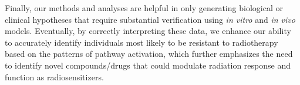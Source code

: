 \documentclass[hidelinks,11pt]{article}
\begin{document}
Finally, our methods and analyses are helpful in only generating biological or clinical hypotheses that require substantial verification using \emph{in vitro} and \emph{in vivo} models. Eventually, by correctly interpreting these data, we enhance our ability to accurately identify individuals most likely to be resistant to radiotherapy based on the patterns of pathway activation, which further emphasizes the need to identify novel compounds/drugs that could modulate radiation response and function as radiosensitizers.

\end{document}
